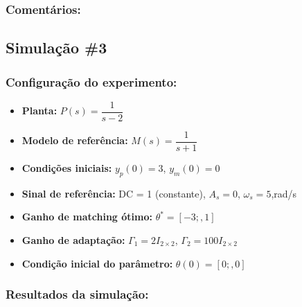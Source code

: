 \documentclass[10pt]{article}
\begin{document}
\subsubsection{Comentários:}

\subsection{Simulação \#3}
\subsubsection{Configuração do experimento:}
\begin{itemize}
\item \textbf{Planta:} $P(s) = \dfrac{1}{s - 2}$
\item \textbf{Modelo de referência:} $M(s) = \dfrac{1}{s + 1}$
\item \textbf{Condições iniciais:} $y_p(0)=3$, $y_m(0)=0$
\item \textbf{Sinal de referência:} DC = 1 (constante), $A_s=0$, $\omega_s=5$,rad/s
\item \textbf{Ganho de matching ótimo:} $\theta^* = [-3;,1]$
\item \textbf{Ganho de adaptação:} $\Gamma_1 = 2I_{2\times2}$, $\Gamma_2 = 100 I_{2\times2}$
\item \textbf{Condição inicial do parâmetro:} $\theta(0) = [0;,0]$
\end{itemize}

\subsubsection{Resultados da simulação:}
\end{document}
